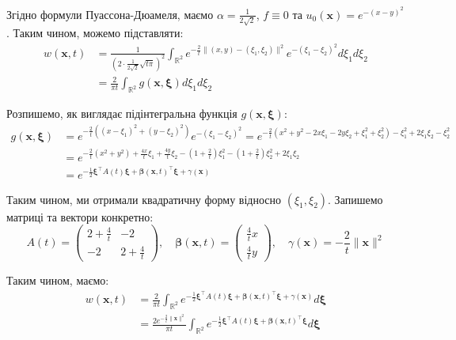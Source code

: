 \documentclass{hw_template}
\begin{document}
Згідно формули Пуассона-Дюамеля, маємо $\alpha = \frac{1}{2\sqrt{2}}$, $f \equiv 0$ та 
$u_0(\mathbf{x}) = e^{-(x-y)^2}$. Таким чином, можемо підставляти:
\begin{align*}
    w(\mathbf{x}, t) &= \frac{1}{\left(2 \cdot \frac{1}{2\sqrt{2}}\sqrt{t\pi}\right)^2}\int_{\mathbb{R}^2}e^{-\frac{2}{t}\|(x,y)-(\xi_1,\xi_2)\|^2}e^{-(\xi_1-\xi_2)^2}d\xi_1 d\xi_2  \\
    &= \frac{2}{\pi t}\int_{\mathbb{R}^2}g(\mathbf{x},\boldsymbol{\xi})d\xi_1 d\xi_2
\end{align*}

Розпишемо, як виглядає підінтегральна функція $g(\mathbf{x}, \boldsymbol{\xi})$:
\begin{align*}
    g(\mathbf{x}, \boldsymbol{\xi}) &= e^{-\frac{2}{t}((x-\xi_1)^2 + (y-\xi_2)^2)}e^{-(\xi_1-\xi_2)^2} = e^{-\frac{2}{t}(x^2 + y^2 - 2x\xi_1 - 2y\xi_2 + \xi_1^2 + \xi_2^2) - \xi_1^2 + 2\xi_1\xi_2 - \xi_2^2} \\
    &= e^{-\frac{2}{t}(x^2 + y^2) + \frac{4x}{t}\xi_1 + \frac{4y}{t}\xi_2 - \left(1+\frac{2}{t}\right)\xi_1^2 - \left(1+\frac{2}{t}\right)\xi_2^2 + 2\xi_1\xi_2} \\
    &= e^{-\frac{1}{2}\boldsymbol{\xi}^{\top}A(t)\boldsymbol{\xi} + \boldsymbol{\beta}(\mathbf{x},t)^{\top}\boldsymbol{\xi} + \gamma(\mathbf{x})}
\end{align*}

Таким чином, ми отримали квадратичну форму відносно $(\xi_1,\xi_2)$. Запишемо
матриці та вектори конкретно:
\begin{equation*}
    A(t) = \begin{pmatrix}
        2+\frac{4}{t} & -2 \\
        -2 & 2+\frac{4}{t}
    \end{pmatrix}, \quad \boldsymbol{\beta}(\mathbf{x},t) = \begin{pmatrix}
        \frac{4}{t}x \\
        \frac{4}{t}y
    \end{pmatrix}, \quad \gamma(\mathbf{x}) = -\frac{2}{t}\|\mathbf{x}\|^2
\end{equation*}

Таким чином, маємо:
\begin{align*}
    w(\mathbf{x},t) &= \frac{2}{\pi t}\int_{\mathbb{R}^2}e^{-\frac{1}{2}\boldsymbol{\xi}^{\top}A(t)\boldsymbol{\xi} + \boldsymbol{\beta}(\mathbf{x},t)^{\top}\boldsymbol{\xi} + \gamma(\mathbf{x})}d\boldsymbol{\xi} \\
    &= \frac{2e^{-\frac{2}{t}\|\mathbf{x}\|^2}}{\pi t}\int_{\mathbb{R}^2}e^{-\frac{1}{2}\boldsymbol{\xi}^{\top}A(t)\boldsymbol{\xi} + \boldsymbol{\beta}(\mathbf{x},t)^{\top}\boldsymbol{\xi}}d\boldsymbol{\xi}
\end{align*}
\end{document}
